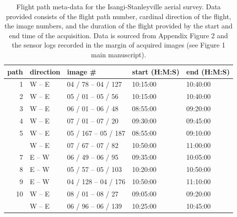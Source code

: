 \documentclass[landscape]{article}
\begin{document}
\begin{table}[!h]

\caption{\label{tab:unnamed-chunk-2}Flight path meta-data for the Isangi-Stanleyville aerial survey. Data provided consists of the flight path number, cardinal direction of the flight, the image numbers, and the duration of the flight provided by the start and end time of the acquisition. Data is sourced from Appendix Figure 2 and the sensor logs recorded in the margin of acquired images (see Figure 1 main manuscript).}
\centering
\begin{tabular}[t]{rllll}
\toprule
path & direction & image \# & start (H:M:S) & end (H:M:S)\\
\midrule
1 & W – E & 04 / 78 – 04 / 127 & 10:15:00 & 10:40:00\\
2 & W – E & 05 / 01 – 05 / 56 & 10:15:00 & 10:40:00\\
3 & W – E & 06 / 01 – 06 / 48 & 08:55:00 & 09:20:00\\
4 & W – E & 07 / 01 – 07 / 20 & 09:30:00 & 09:45:00\\
5 & W – E & 05 / 167 – 05 / 187 & 08:55:00 & 09:10:00\\
\addlinespace
6 & W – E & 07 / 67 – 07 / 82 & 10:50:00 & 11:00:00\\
7 & E – W & 06 / 49 – 06 / 95 & 09:35:00 & 10:05:00\\
8 & E – W & 05 / 57 – 05 / 103 & 10:20:00 & 10:50:00\\
9 & E – W & 04 / 128 – 04 / 176 & 10:50:00 & 11:10:00\\
10 & W – E & 08 / 01 – 08 / 27 & 09:05:00 & 09:20:00\\
\addlinespace
11 & W – E & 06 / 96 – 06 / 139 & 10:25:00 & 10:45:00\\
\bottomrule
\end{tabular}
\end{table}

\pagebreak
\end{document}
